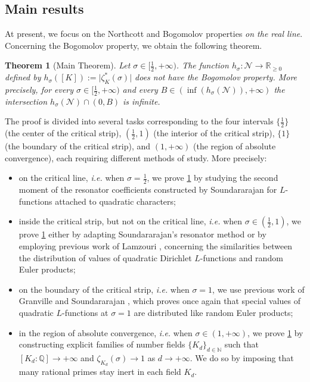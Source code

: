 \documentclass[10pt,a4paper]{amsart}
\theoremstyle{plain}
\newtheorem{theorem}{Theorem}[section]
\theoremstyle{definition}
\theoremstyle{remark}
\begin{document}
\subsection{Main results}
At present, we focus on the Northcott and Bogomolov properties \textit{on the real line}. Concerning the Bogomolov property, we obtain the following theorem.

\begin{theorem}[Main Theorem]\label{Main theorem}
Let $\sigma \in [\frac{1}{2},+\infty)$.
    The function $h_\sigma \colon \mathcal{N} \to \mathbb{R}_{\geq 0}$ defined by $h_\sigma([K]) := \lvert \zeta^\ast_K(\sigma) \rvert$ does not have the Bogomolov property. More precisely, for every $\sigma \in [\frac{1}{2},+\infty)$ and every $B \in (\inf(h_\sigma(\mathcal{N})),+\infty)$ the intersection $h_\sigma(\mathcal{N}) \cap (0,B)$ is infinite.
\end{theorem}

The proof is divided into several tasks corresponding to the four intervals $\{\frac{1}{2}\}$ (the center of the critical strip), $(\frac{1}{2},1)$ (the interior of the critical strip), $\{1\}$ (the boundary of the critical strip), and $(1,+\infty)$ (the region of absolute convergence), each requiring different methods of study. More precisely:
\begin{itemize}
\item on the critical line, \textit{i.e.} when $\sigma=\frac{1}{2}$, we prove \cref{Main theorem} by studying the second moment of the resonator coefficients constructed by Soundararajan \cite{Soundararajan_2008} for $L$-functions attached to quadratic characters;
\item inside the critical strip, but not on the critical line, \textit{i.e.} when $\sigma \in (\frac{1}{2},1)$, we prove \cref{Main theorem} either by adapting Soundararajan's resonator method or by employing previous work of Lamzouri \cite{Lamzouri_2011}, concerning the similarities between the distribution of values of quadratic Dirichlet $L$-functions and random Euler products;
\item on the boundary of the critical strip, \textit{i.e.} when $\sigma = 1$, we use previous work of Granville and Soundararajan \cite{Granville_Soundararajan_2003}, which proves once again that special values of quadratic $L$-functions at $\sigma = 1$ are distributed like random Euler products;
\item in the region of absolute convergence, \textit{i.e.} when $\sigma \in (1,+\infty)$, we prove \cref{Main theorem} by constructing explicit families of number fields $\{ K_d \}_{d \in \mathbb{N}}$ such that $[K_d \colon \mathbb{Q}] \to +\infty$ and $\zeta_{K_d}(\sigma) \to 1$ as $d \to +\infty$. We do so by imposing that many rational primes stay inert in each field $K_d$.
\end{itemize}
\end{document}
